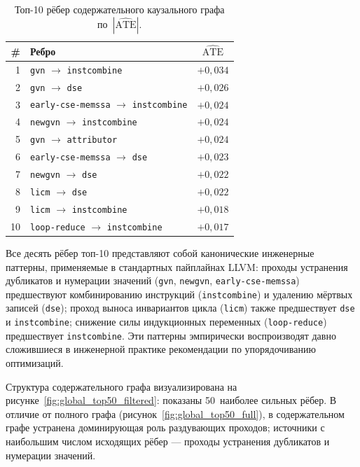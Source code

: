 \begin{table}[h]
\centering
\caption{Топ-10 рёбер содержательного каузального графа по~$|\widehat{\text{ATE}}|$.}
\label{tab:top10_engineering}
\begin{tabular}{rlc}
\hline
\# & Ребро & $\widehat{\text{ATE}}$ \\
\hline
1  & \texttt{gvn} $\to$ \texttt{instcombine}                                       & $+0{,}034$ \\
2  & \texttt{gvn} $\to$ \texttt{dse}                                               & $+0{,}026$ \\
3  & \texttt{early-\allowbreak cse-\allowbreak memssa} $\to$ \texttt{instcombine}  & $+0{,}024$ \\
4  & \texttt{newgvn} $\to$ \texttt{instcombine}                                    & $+0{,}024$ \\
5  & \texttt{gvn} $\to$ \texttt{attributor}                                        & $+0{,}024$ \\
6  & \texttt{early-\allowbreak cse-\allowbreak memssa} $\to$ \texttt{dse}          & $+0{,}023$ \\
7  & \texttt{newgvn} $\to$ \texttt{dse}                                            & $+0{,}022$ \\
8  & \texttt{licm} $\to$ \texttt{dse}                                              & $+0{,}022$ \\
9  & \texttt{licm} $\to$ \texttt{instcombine}                                      & $+0{,}018$ \\
10 & \texttt{loop-reduce} $\to$ \texttt{instcombine}                               & $+0{,}017$ \\
\hline
\end{tabular}
\end{table}

Все десять рёбер топ-10 представляют собой канонические инженерные паттерны, применяемые в стандартных пайплайнах LLVM: проходы устранения дубликатов и нумерации значений (\texttt{gvn}, \texttt{newgvn}, \texttt{early-cse-memssa}) предшествуют комбинированию инструкций (\texttt{instcombine}) и удалению мёртвых записей (\texttt{dse}); проход выноса инвариантов цикла (\texttt{licm}) также предшествует \texttt{dse} и \texttt{instcombine}; снижение силы индукционных переменных (\texttt{loop-reduce}) предшествует \texttt{instcombine}. Эти паттерны эмпирически воспроизводят давно сложившиеся в инженерной практике рекомендации по упорядочиванию оптимизаций.

Структура содержательного графа визуализирована на рисунке~\ref{fig:global_top50_filtered}: показаны 50~наиболее сильных рёбер. В отличие от полного графа (рисунок~\ref{fig:global_top50_full}), в содержательном графе устранена доминирующая роль раздувающих проходов; источники с наибольшим числом исходящих рёбер --- проходы устранения дубликатов и нумерации значений.

